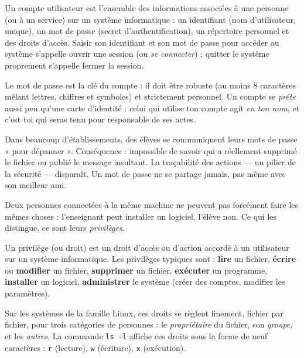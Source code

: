 \documentclass[11pt]{article}
\newcommand{\cle}[1]{{\popxbold\color{popdark}#1}}
\newcounter{popsec}
\newcounter{popsub}
\newcommand{\courssub}[1]{%
  \stepcounter{popsub}%
  \par\vspace{9pt}\noindent{\popxbold\fontsize{11.5}{13}\selectfont\color{popink}{\color{poporange}\thepopsec.\thepopsub}\hspace{6pt}#1}\par\nopagebreak\vspace{4pt}
}
\begin{document}
\begin{definition}
Un \cle{compte utilisateur} est l'ensemble des informations associées à une personne (ou à un service) sur un système informatique : un \cle{identifiant} (nom d'utilisateur, unique), un \cle{mot de passe} (secret d'authentification), un répertoire personnel et des droits d'accès. Saisir son identifiant et son mot de passe pour accéder au système s'appelle \cle{ouvrir une session} (ou \emph{se connecter}) ; quitter le système proprement s'appelle \cle{fermer la session}.
\end{definition}

Le mot de passe est la clé du compte : il doit être robuste (au moins 8 caractères mêlant lettres, chiffres et symboles) et strictement personnel. Un compte se \emph{prête} aussi peu qu'une carte d'identité : celui qui utilise ton compte agit \emph{en ton nom}, et c'est toi qui seras tenu pour responsable de ses actes.

\begin{attention}
Dans beaucoup d'établissements, des élèves se communiquent leurs mots de passe « pour dépanner ». Conséquence : impossible de savoir qui a réellement supprimé le fichier ou publié le message insultant. La \cle{traçabilité} des actions — un pilier de la sécurité — disparaît. Un mot de passe ne se partage jamais, pas même avec son meilleur ami.
\end{attention}

\courssub{Notion de privilège}

Deux personnes connectées à la même machine ne peuvent pas forcément faire les mêmes choses : l'enseignant peut installer un logiciel, l'élève non. Ce qui les distingue, ce sont leurs \emph{privilèges}.

\begin{definition}[Privilège]
Un \cle{privilège} (ou \cle{droit}) est un droit d'accès ou d'action accordé à un utilisateur sur un système informatique. Les privilèges typiques sont : \textbf{lire} un fichier, \textbf{écrire} ou \textbf{modifier} un fichier, \textbf{supprimer} un fichier, \textbf{exécuter} un programme, \textbf{installer} un logiciel, \textbf{administrer} le système (créer des comptes, modifier les paramètres).
\end{definition}

Sur les systèmes de la famille Linux, ces droits se règlent finement, fichier par fichier, pour trois catégories de personnes : le \emph{propriétaire} du fichier, son \emph{groupe}, et les \emph{autres}. La commande \texttt{ls -l} affiche ces droits sous la forme de neuf caractères : \texttt{r} (lecture), \texttt{w} (écriture), \texttt{x} (exécution).
\end{document}
